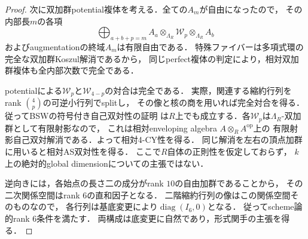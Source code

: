 \begin{proof}
次に双加群potential複体を考える．全ての$A_m$が自由になったので，
その内部長$m$の各項
\[
 \bigoplus_{a+b+p=m}
 A_a\otimes_{\Lambda_R}\mathcal W_p\otimes_{\Lambda_R}A_b
\]
およびaugmentationの終域$A_m$は有限自由である．
特殊ファイバーは多項式環の完全な双加群Koszul解消であるから，
同じperfect複体の判定により，相対双加群複体も全内部次数で完全である．

potentialによる$\mathcal W_p$と$\mathcal W_{4-p}$の対合は完全である．
実際，関連する縮約行列をrank $\binom4p$の可逆小行列でsplitし，
その像と核の商を用いれば完全対合を得る．
従ってBSWの符号付き自己双対性の証明
\cite[Lemma~6.4 and the proof of Theorem~6.2]{BSWPotentials}
は$R$上でも成立する．各$\mathcal W_p$は$\Lambda_R$-双加群として有限射影なので，
これは相対enveloping algebra $A\otimes_R A^{\mathrm{op}}$上の
有限射影自己双対解消である．よって相対4-CY性を得る．
同じ解消を左右の頂点加群に用いると相対AS双対性を得る．
ここで$R$自体の正則性を仮定しておらず，
$k$上の絶対的global dimensionについての主張ではない．

逆向きには，各始点の長さ二の成分がrank $10$の自由加群であることから，
その二次関係空間はrank $6$の直和因子となる．
二階縮約行列の像はこの関係空間そのものなので，
各行列は基底変更により$\operatorname{diag}(I_6,0)$となる．
従ってscheme論的rank $6$条件を満たす．
両構成は底変更に自然であり，形式関手の主張を得る．
\end{proof}

